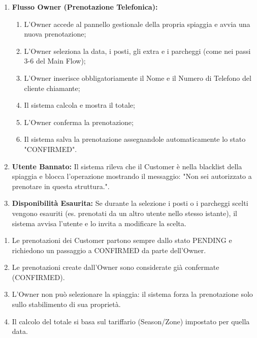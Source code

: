 \documentclass{article}
\begin{document}
	{
		\begin{enumerate}[nosep, leftmargin=33px]
			\item[\textbf{1a.}] \textbf{Flusso Owner (Prenotazione Telefonica):}
			\begin{enumerate}[nosep, leftmargin=*]
				\item[i.] L'Owner accede al pannello gestionale della propria spiaggia e avvia una nuova prenotazione;
				\item[ii.] L'Owner seleziona la data, i posti, gli extra e i parcheggi (come nei passi 3-6 del Main Flow);
				\item[iii.] L'Owner inserisce obbligatoriamente il Nome e il Numero di Telefono del cliente chiamante;
				\item[iv.] Il sistema calcola e mostra il totale;
				\item[v.] L'Owner conferma la prenotazione;
				\item[vi.] Il sistema salva la prenotazione assegnandole automaticamente lo stato "CONFIRMED".
			\end{enumerate}
			\item[\textbf{2a-e.}] \textbf{Utente Bannato:} Il sistema rileva che il Customer è nella blacklist della spiaggia e blocca l'operazione mostrando il messaggio: "Non sei autorizzato a prenotare in questa struttura.".
			\item[\textbf{4/6a-e.}] \textbf{Disponibilità Esaurita:} Se durante la selezione i posti o i parcheggi scelti vengono esauriti (es. prenotati da un altro utente nello stesso istante), il sistema avvisa l'utente e lo invita a modificare la scelta.
		\end{enumerate}
	}
	{
		\begin{enumerate}[nosep, leftmargin=*]
			\item[•] Le prenotazioni dei Customer partono sempre dallo stato PENDING e richiedono un passaggio a CONFIRMED da parte dell'Owner.
			\item[•] Le prenotazioni create dall'Owner sono considerate già confermate (CONFIRMED). 
			\item[•] L'Owner non può selezionare la spiaggia: il sistema forza la prenotazione solo sullo stabilimento di sua proprietà.
			\item[•] Il calcolo del totale si basa sul tariffario (Season/Zone) impostato per quella data.
		\end{enumerate}
	}
		
	\newpage
	
\end{document}
